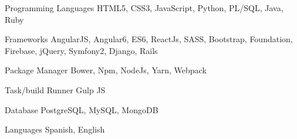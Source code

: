 


\begin{cvskills}


\cvskill
{Programming Languages} %
{HTML5, CSS3, JavaScript, Python, PL/SQL, Java, Ruby} %


\cvskill
{Frameworks} %
{AngularJS, Angular6, ES6, ReactJs, SASS, Bootstrap, Foundation, Firebase, jQuery, Symfony2, Django, Rails } %


\cvskill
{Package Manager} %
{Bower, Npm, NodeJs, Yarn, Webpack} %


\cvskill
{Task/build Runner } %
{Gulp JS} %


\cvskill
{Database} %
{PostgreSQL, MySQL, MongoDB} %


\cvskill
{Languages} %
{Spanish, English} %




\end{cvskills}

